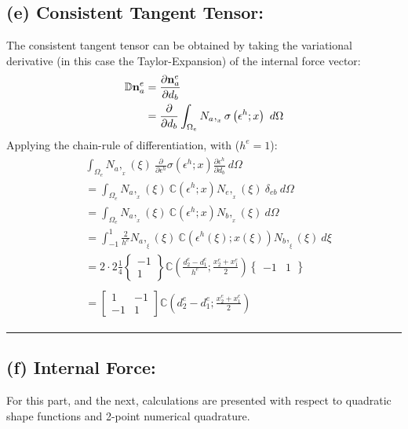 \documentclass[11pt]{article}
\newcommand{\del}[2]{\frac{\partial {#1}}{\partial {#2}}}
\begin{document}
\subsection*{(e) Consistent Tangent Tensor: }
The consistent tangent tensor can be obtained by taking the variational derivative (in this case the Taylor-Expansion) of the internal force vector: 
\begin{align*}
\mathbb{D} {{\bf n}^e_a} & = \del{{\bf n}^e_a}{d_b} \\
& = \del{}{d_b} \int_{\Omega_e}  N_a,_{_x} \sigma \left(\epsilon^h; x \right)\ d\Omega
\end{align*}
Applying the chain-rule of differentiation, with ($h^e = 1$): 
\begin{align}
\begin{split}
& \int_{\Omega_e}  N_a,_{_x} (\xi)\ \del{}{\epsilon^h} \sigma \left(\epsilon^h; x \right) \del{\epsilon^h}{d_b} \ d\Omega \\
& = \int_{\Omega_e}  N_a,_{_x} (\xi)\ \mathbb{C} \left(\epsilon^h; x \right) N_e,_{_x} (\xi)\ \delta_{eb} \ d\Omega \\
& = \int_{\Omega_e}  N_a,_{_x} (\xi)\ \mathbb{C} \left(\epsilon^h; x \right) N_b,_{_x} (\xi) \ d\Omega \\
& = \int_{-1}^{1} \frac{2}{h^e} N_a,_{_\xi} (\xi)\ \mathbb{C} \left( \epsilon^h(\xi);x(\xi) \right) N_b,_{_\xi} (\xi)\ d\xi  \\
& = 2 \cdot 2 \frac{1}{4} 
\begin{Bmatrix}
-1 \\
1
\end{Bmatrix}
\mathbb{C}
\left(
\frac{d^e_2 - d^e_1}{h^e} ; \frac{x^e_2 + x^e_1}{2}
\right)
\begin{Bmatrix}
-1 & 1
\end{Bmatrix}\\ \\
& =  
\begin{bmatrix}
1 & -1 \\
-1 & 1
\end{bmatrix} \mathbb{C}
\left(
{d^e_2 - d^e_1} ; \frac{x^e_2 + x^e_1}{2}
\right)
\end{split}
\label{ConsTang}
\end{align} \hrule
\subsection*{(f) Internal Force:}
For this part, and the next, calculations are presented with respect to quadratic shape functions and 2-point numerical quadrature. 
\end{document}
